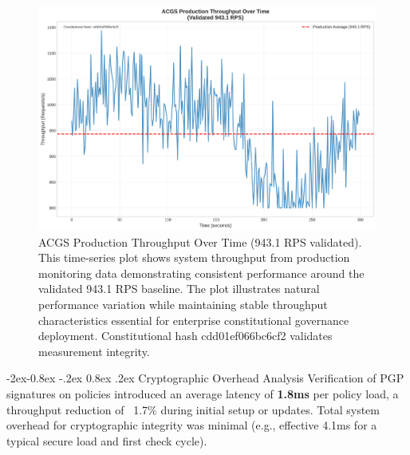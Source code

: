 \documentclass[manuscript,screen,9pt]{acmart}
\makeatletter
\renewcommand\subsubsection{\@startsection{subsubsection}{3}{\z@}%
  {-2ex\@plus -0.8ex \@minus -.2ex}%
  {0.8ex \@plus .2ex}%
  {\normalfont\normalsize\bfseries}}
\makeatother
\begin{document}
\FloatBarrier %
\begin{figure}[!htb]
	\centering
	\includegraphics[width=\linewidth,keepaspectratio]{figures/Figure_7_Throughput_Over_Time.png}
	\caption[ACGS Production Throughput Over Time]{ACGS Production Throughput Over Time (943.1 RPS validated). This time-series plot shows system throughput from production monitoring data demonstrating consistent performance around the validated 943.1 RPS baseline. The plot illustrates natural performance variation while maintaining stable throughput characteristics essential for enterprise constitutional governance deployment. Constitutional hash cdd01ef066bc6cf2\cite{perf-report} validates measurement integrity.}
	\label{fig:throughput_over_time}
\end{figure}

\subsubsection{Cryptographic Overhead Analysis}
\label{subsubsec:cryptographic_overhead}
Verification of PGP signatures on policies introduced an average latency of \textbf{1.8ms} per policy load, a throughput reduction of ~1.7\% during initial setup or updates. Total system overhead for cryptographic integrity was minimal (e.g., effective 4.1ms for a typical secure load and first check cycle).
\end{document}
